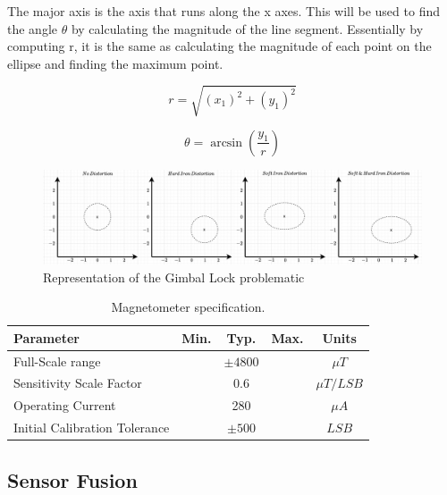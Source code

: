 The major axis is the axis that runs along the x axes. This will be used to find the angle $\theta$ by calculating the magnitude of the line segment. Essentially by computing r, it is the same as calculating the magnitude of each point on the ellipse and finding the maximum point.

\begin{equation}
    r=\sqrt{(x_1)^2+(y_1)^2}
\end{equation}

\begin{equation}
    \theta=\arcsin(\frac{y_1}{r})
\end{equation}

\begin{figure}[!h]
    \centering
    \includegraphics[width=1\textwidth]{figures/magnetometer_distortion.pdf}
    \caption{Representation of the Gimbal Lock problematic}
    \label{fig:gyroscope}
\end{figure}

\begin{table}[H]
    \begin{center}
        \begin{tabular}[t]{lcccc}
            \hline
            Parameter                     & Min. & Typ.       & Max. & Units        \\
            \hline
            Full-Scale range              &      & $\pm 4800$ &      & $\mu T$      \\
            Sensitivity Scale Factor      &      & 0.6        &      & $\mu T/ LSB$ \\
            Operating Current             &      & 280        &      & $\mu A$      \\
            Initial Calibration Tolerance &      & $\pm 500$  &      & $LSB$        \\
            \hline
        \end{tabular}
        \caption{Magnetometer specification. }
        \label{tab:magnetometer_multiplication}
    \end{center}
\end{table}

\subsection{Sensor Fusion}
